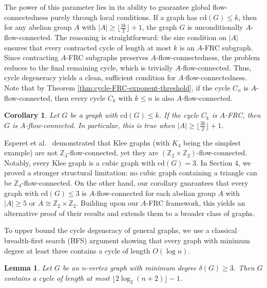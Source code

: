\documentclass[a4paper,12pt]{article}
\theoremstyle{plain}
\newtheorem{lemma}[theorem]{Lemma}
\newtheorem{corollary}[theorem]{Corollary}
\theoremstyle{definition}
\renewcommand\le\leqslant
\renewcommand\ge\geqslant
\begin{document}
The power of this parameter lies in its ability to guarantee global flow-connectedness purely through local conditions. If a graph has $\mathrm{cd}(G) \le k$, then for any abelian group $A$ with $|A| \ge \lfloor \frac{3k}{2} \rfloor + 1$, the graph $G$ is unconditionally $A$-flow-connected. The reasoning is straightforward: the size condition on $|A|$ ensures that every contracted cycle of length at most $k$ is an $A$-FRC subgraph. Since contracting $A$-FRC subgraphs preserves $A$-flow-connectedness, the problem reduces to the final remaining cycle, which is trivially $A$-flow-connected. Thus, cycle degeneracy yields a clean, sufficient condition for $A$-flow-connectedness. Note that by Theorem \ref{thm:cycle-FRC-exponent-threshold}, if the cycle $C_n$ is $A$-flow-connected, then every cycle $C_k$ with $k \le n$ is also $A$-flow-connected.

\begin{corollary}\label{cor: cd-A-flow}
Let $G$ be a graph with $\mathrm{cd}(G) \le k$. If the cycle $C_k$ is $A$-FRC, then $G$ is $A$-flow-connected. In particular, this is true when $|A| \ge \lfloor \frac{3k}{2} \rfloor + 1$.
\end{corollary}

Esperet et al.~\cite{esperet-et-al} demonstrated that Klee graphs (with $K_4$ being the simplest example) are not $\mathbb{Z}_4$-flow-connected, yet they are $(\mathbb{Z}_2 \times \mathbb{Z}_2)$-flow-connected. Notably, every Klee graph is a cubic graph with $\mathrm{cd}(G) = 3$. In Section 4, we proved a stronger structural limitation: no cubic graph containing a triangle can be $\mathbb{Z}_4$-flow-connected. On the other hand, our corollary guarantees that every graph with $\mathrm{cd}(G) \le 3$ is $A$-flow-connected for each abelian group $A$ with $|A| \ge 5$ or $A \cong \mathbb{Z}_2 \times \mathbb{Z}_2$. 
Building upon our $A$-FRC framework, this yields an alternative proof of their results and extends them to a broader class of graphs.

To upper bound the cycle degeneracy of general graphs, we use a classical breadth-first search (BFS) argument showing that every graph with minimum degree at least three contains a cycle of length $O(\log n)$.

\begin{lemma}\label{lem:log-cycle}
Let $G$ be an $n$-vertex graph with minimum degree $\delta(G) \ge 3$. Then $G$ contains a cycle of length at most $\lfloor2\log_2(n+2)\rfloor-1$.
\end{lemma}
\end{document}
